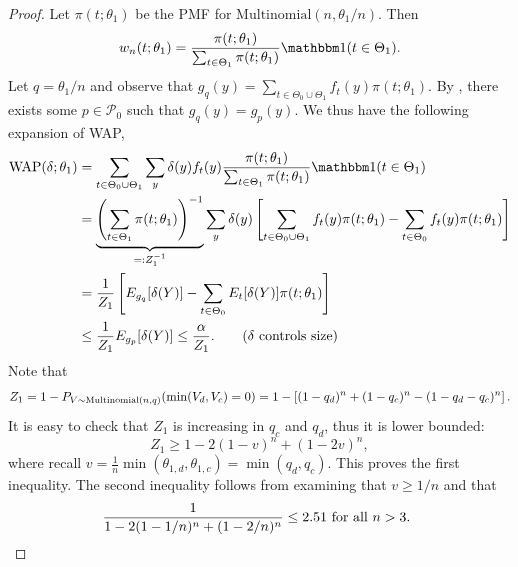 \documentclass[12pt,reqno]{amsart}
\begin{document}
\propnowap*
\begin{proof}
    Let $\pi(t; \theta_1)$ be the PMF for $\mathrm{Multinomial}(n, \theta_1/n)$. Then \[
        w_n(t;\theta_1) = \frac{\pi(t;\theta_1)}{\sum_{t\in\Theta_1} \pi(t;\theta_1)} \one
        (t\in\Theta_1).
    \]
    Let $q=\theta_1/n$ and observe that $g_{q}(y) = \sum_{t \in \Theta_0 \cup \Theta_1} f_t(y) \pi(t;\theta_1)$. By
    , there exists some $p\in \mathcal P_0$ such that $g_{q}(y) = g_p
    (y)$. We thus have the following expansion of WAP, \begin{align*}
    \mathrm{WAP}(\delta;\theta_1) &= \sum_{t \in \Theta_0 \cup \Theta_1} \sum_y \delta(y) f_t(y)\frac{\pi(t;\theta_1)}{\sum_{t\in\Theta_1} \pi(t;\theta_1)} \one
        (t\in\Theta_1) \\
        &= \underbrace{\pr{\sum_{t\in\Theta_1} \pi(t;\theta_1)}^{-1}}_{=: Z_1^{-1}}
        \sum_ {y} \delta (y) \bk{\sum_ {t \in
        \Theta_0
        \cup \Theta_1} f_t(y) \pi(t; \theta_1) - \sum_{t\in \Theta_0} f_t(y)\pi(t;\theta_1)}
        \\
        &= \frac{1}{Z_1} \bk{E_{g_{q}}[\delta(Y)] - \sum_{t\in\Theta_0} E_t[\delta(Y)] \pi
        (t;
        \theta_1)} \\
        &\le \frac{1}{Z_1} E_{g_p}[\delta(Y)] \le \frac{\alpha}{Z_1}. \tag{$\delta$ controls size}
    \end{align*}
    Note that \[
        Z_1 = 1-P_{V \sim \mathrm{Multinomial}(n, q)} (\min(V_d, V_c) = 0) = 1 -
        \left[{
            (1-q_d)^n + (1-q_c)^n - (1-q_d - q_c)^n
        }\right].
    \]
    It is easy to check that $Z_1$ is increasing in $q_c$ and $q_d$, thus it is lower
    bounded: \[
        Z_1 \ge 1-2(1-v)^n + (1-2v)^n,
    \]
    where recall $v = \tfrac{1}{n} \min(\theta_{1,d},\theta_{1,c}) = \min(q_d,q_c)$. This proves the first inequality. The second inequality follows from examining that
    $v \ge 1/n$ and that \[
    \frac{1}{1-2(1-1/n)^n + (1-2/n)^n} \le 2.51 \text{ for all $n > 3$. } \qedhere
    \]
\end{proof}
\end{document}
